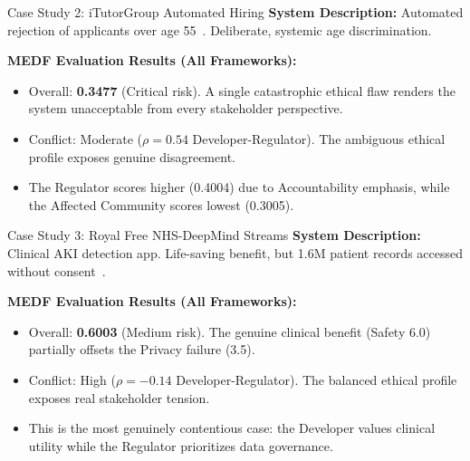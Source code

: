 \begin{frame}{Case Study 2: iTutorGroup Automated Hiring}
    \textbf{System Description:} Automated rejection of applicants over age 55~\cite{eeoc2022itutorgroup}. Deliberate, systemic age discrimination.

    \vspace{8pt}
    \textbf{MEDF Evaluation Results (All Frameworks):}
    \begin{itemize}
        \item Overall: \textbf{0.3477} (Critical risk). A single catastrophic ethical flaw renders the system unacceptable from every stakeholder perspective.
        \item Conflict: Moderate ($\rho = 0.54$ Developer-Regulator). The ambiguous ethical profile exposes genuine disagreement.
        \item The Regulator scores higher (0.4004) due to Accountability emphasis, while the Affected Community scores lowest (0.3005).
    \end{itemize}
\end{frame}

\begin{frame}{Case Study 3: Royal Free NHS-DeepMind Streams}
    \textbf{System Description:} Clinical AKI detection app. Life-saving benefit, but 1.6M patient records accessed without consent~\cite{ico2017deepmind}.

    \vspace{8pt}
    \textbf{MEDF Evaluation Results (All Frameworks):}
    \begin{itemize}
        \item Overall: \textbf{0.6003} (Medium risk). The genuine clinical benefit (Safety 6.0) partially offsets the Privacy failure (3.5).
        \item Conflict: High ($\rho = -0.14$ Developer-Regulator). The balanced ethical profile exposes real stakeholder tension.
        \item This is the most genuinely contentious case: the Developer values clinical utility while the Regulator prioritizes data governance.
    \end{itemize}
\end{frame}

